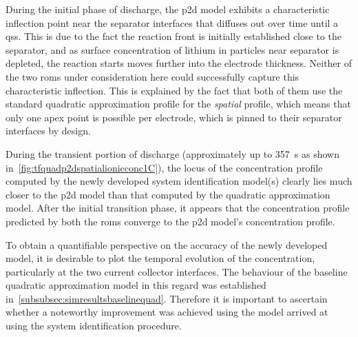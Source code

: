 During  the  initial  phase  of   discharge,  the  \gls{p2d}  model  exhibits  a
characteristic inflection point near the  separator interfaces that diffuses out
over time  until a  \gls{qss}. This  is due to  the fact  the reaction  front is
initially established  close to the  separator, and as surface  concentration of
lithium  in particles  near separator  is  depleted, the  reaction starts  moves
further  into the  electrode thickness.  Neither  of the  two \glspl{rom}  under
consideration here  could successfully  capture this  characteristic inflection.
This is  explained by  the fact  that both  of them  use the  standard quadratic
approximation profile for the \emph{spatial}  profile, which means that only one
apex  point is  possible  per  electrode, which  is  pinned  to their  separator
interfaces by design.

During the transient portion of discharge (approximately up to \SI{357}{\second}
as   shown   in~\cref{fig:tfquadp2dspatialionicconc1C}),   the  locus   of   the
concentration  profile computed  by  the newly  developed system  identification
model(s) clearly lies  much closer to the \gls{p2d} model  than that computed by
the  quadratic  approximation model.  After  the  initial transition  phase,  it
appears  that  the  concentration  profile predicted  by  both  the  \glspl{rom}
converge to the \gls{p2d} model's concentration profile.


To obtain  a quantifiable  perspective on  the accuracy  of the  newly developed
model, it  is desirable  to plot  the temporal  evolution of  the concentration,
particularly  at  the  two  current   collector  interfaces.  The  behaviour  of
the  baseline  quadratic approximation  model  in  this regard  was  established
in~\cref{subsubsec:simresultsbaselinequad}.   Therefore  it   is  important   to
ascertain whether a noteworthy improvement  was achieved using the model arrived
at using the system identification procedure.


